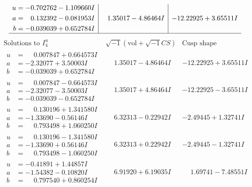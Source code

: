 \documentclass[1p]{elsarticle_modified}
\theoremstyle{definition}
\newcommand{\I}{\sqrt{-1}}
\begin{document}
$$\begin{array}{c|c|c}
\begin{aligned}
u &= -0.702762 - 1.109660 I \\
a &= \phantom{-}0.132392 - 0.081953 I \\
b &= -0.039039 + 0.652784 I\end{aligned}
 & \phantom{-}1.35017 - 4.86464 I & -12.22925 + 3.65511 I\\
 \hline 
 \end{array}$$\newpage$$\begin{array}{c|c|c}  
\text{Solutions to }I^u_{4}& \I (\text{vol} + \sqrt{-1}CS) & \text{Cusp shape}\\
 \hline 
\begin{aligned}
u &= \phantom{-}0.007847 + 0.664573 I \\
a &= -2.32077 + 3.50003 I \\
b &= -0.039039 + 0.652784 I\end{aligned}
 & \phantom{-}1.35017 - 4.86464 I & -12.22925 + 3.65511 I \\ \hline\begin{aligned}
u &= \phantom{-}0.007847 - 0.664573 I \\
a &= -2.32077 - 3.50003 I \\
b &= -0.039039 - 0.652784 I\end{aligned}
 & \phantom{-}1.35017 + 4.86464 I & -12.22925 - 3.65511 I \\ \hline\begin{aligned}
u &= \phantom{-}0.130196 + 1.341580 I \\
a &= -1.33690 - 0.56146 I \\
b &= \phantom{-}0.793498 + 1.060250 I\end{aligned}
 & \phantom{-}6.32313 - 0.22942 I & -2.49445 + 1.32741 I \\ \hline\begin{aligned}
u &= \phantom{-}0.130196 - 1.341580 I \\
a &= -1.33690 + 0.56146 I \\
b &= \phantom{-}0.793498 - 1.060250 I\end{aligned}
 & \phantom{-}6.32313 + 0.22942 I & -2.49445 - 1.32741 I \\ \hline\begin{aligned}
u &= -0.41891 + 1.44857 I \\
a &= -1.54382 - 0.10820 I \\
b &= \phantom{-}0.797540 + 0.860254 I\end{aligned}
 & \phantom{-}6.91920 + 6.19035 I & \phantom{-}1.69741 - 7.48551 I \\ \hline\begin{aligned}

\end{aligned}
\end{array}$$
\end{document}
